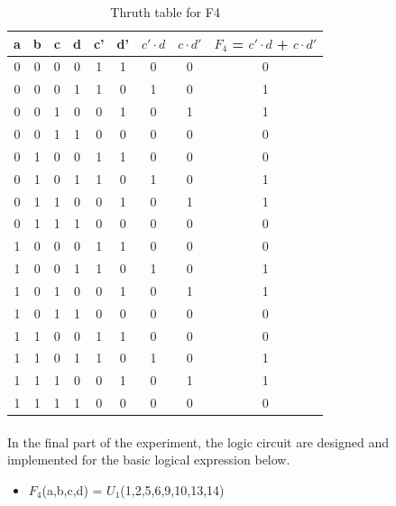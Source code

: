 \documentclass[pdftex,12pt,a4paper]{article}
\begin{document}
\begin{flushleft}
\begin{table}[h]
\centering
\begin{tabular}{|c|c|c|c|c|c|c|c|c|}
\hline
a & b & c & d & c' & d' & $c' \cdot d$ & $c \cdot d'$ & $F_{4}$ = $c' \cdot d$ + $c \cdot d'$ \\ \hline
0 & 0 & 0 & 0 & 1  & 1  & 0      & 0      & 0                    \\ \hline
0 & 0 & 0 & 1 & 1  & 0  & 1      & 0      & 1                    \\ \hline
0 & 0 & 1 & 0 & 0  & 1  & 0      & 1      & 1                    \\ \hline
0 & 0 & 1 & 1 & 0  & 0  & 0      & 0      & 0                    \\ \hline
0 & 1 & 0 & 0 & 1  & 1  & 0      & 0      & 0                    \\ \hline
0 & 1 & 0 & 1 & 1  & 0  & 1      & 0      & 1                    \\ \hline
0 & 1 & 1 & 0 & 0  & 1  & 0      & 1      & 1                    \\ \hline
0 & 1 & 1 & 1 & 0  & 0  & 0      & 0      & 0                    \\ \hline
1 & 0 & 0 & 0 & 1  & 1  & 0      & 0      & 0                    \\ \hline
1 & 0 & 0 & 1 & 1  & 0  & 1      & 0      & 1                    \\ \hline
1 & 0 & 1 & 0 & 0  & 1  & 0      & 1      & 1                    \\ \hline
1 & 0 & 1 & 1 & 0  & 0  & 0      & 0      & 0                    \\ \hline
1 & 1 & 0 & 0 & 1  & 1  & 0      & 0      & 0                    \\ \hline
1 & 1 & 0 & 1 & 1  & 0  & 1      & 0      & 1                    \\ \hline
1 & 1 & 1 & 0 & 0  & 1  & 0      & 1      & 1                    \\ \hline
1 & 1 & 1 & 1 & 0  & 0  & 0      & 0      & 0                    \\ \hline
\end{tabular}
\caption{Thruth table for F4}
\label{fig3}
\end{table}

\paragraph{}
In the final part of the experiment, the logic circuit are designed and implemented for the basic logical expression below. 
\begin{itemize}
    \item $F_{4}$(a,b,c,d) = $U_{1}$(1,2,5,6,9,10,13,14)
\end{itemize}

\end{flushleft}
\end{document}
